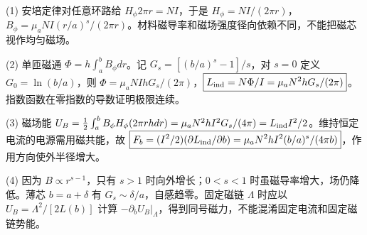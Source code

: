 (1) 安培定律对任意环路给 \(H_\phi2\pi r=NI\)，于是 \(\boxed{H_\phi=NI/(2\pi r)}\)，\(\boxed{B_\phi=\mu_aNI(r/a)^s/(2\pi r)}\)。材料磁导率和磁场强度径向依赖不同，不能把磁芯视作均匀磁场。

(2) 单匝磁通 \(\Phi=h\int_a^bB_\phi dr\)。记 \(G_s=[(b/a)^s-1]/s\)，对 \(s=0\) 定义 \(G_0=\ln(b/a)\)，则 \(\Phi=\mu_aNIhG_s/(2\pi)\)，\(\boxed{L_{\rm ind}=N\Phi/I=\mu_aN^2hG_s/(2\pi)}\)。指数函数在零指数的导数证明极限连续。

(3) 磁场能 \(U_B=\frac12\int_a^bB_\phi H_\phi(2\pi rhdr)=\mu_aN^2hI^2G_s/(4\pi)=L_{\rm ind}I^2/2\)。维持恒定电流的电源需用磁共能，故 \(\boxed{F_b=(I^2/2)(\partial L_{\rm ind}/\partial b)=\mu_aN^2hI^2(b/a)^s/(4\pi b)}\)，作用方向使外半径增大。

(4) 因为 \(B\propto r^{s-1}\)，只有 \(s>1\) 时向外增长；\(0<s<1\) 时虽磁导率增大，场仍降低。薄芯 \(b=a+\delta\) 有 \(G_s\sim\delta/a\)，自感趋零。固定磁链 \(\Lambda\) 时应以 \(U_B=\Lambda^2/[2L(b)]\) 计算 \(-\partial_bU_B|_\Lambda\)，得到同号磁力，不能混淆固定电流和固定磁链势能。
